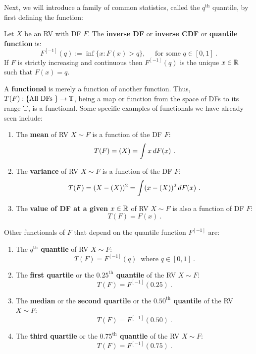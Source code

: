 Next, we will introduce a family of common statistics, called the $q^{\text{th}}$ quantile, by first defining the function:
\begin{definition}
Let $X$ be an RV with DF $F$.  The {\bf inverse DF} or {\bf inverse CDF} or {\bf quantile function} is:
\begin{equation}\label{E:InverseCDF}
F^{[-1]}(q) := \inf { \{ x: F(x) > q \}}, \quad \text{ for some $q \in [0,1]$} \ .
\end{equation}
If $F$ is strictly increasing and continuous then $F^{[-1]}(q)$ is the unique $x \in \mathbb{R}$ such that $F(x)=q$.
\end{definition}
A {\bf functional} is merely a function of another function.  Thus, $T(F): \{ \text{All DFs }\} \to \mathbb{T}$, being a map or function from the space of DFs to its range $\mathbb{T}$, is a functional.  Some specific examples of functionals we have already seen include:
\begin{enumerate}
\item The {\bf mean} of RV $X \sim F$ is a function of the DF $F$:
\[
T(F) = \E(X) = \int x\,dF(x) \ .
\]
\item The {\bf variance} of RV $X \sim F$ is a function of the DF $F$:
\[
T(F) = \mathscr{(}X-\mathscr{(}X))^2 = \int (x-\mathscr{(}X))^2\,dF(x) \ .
\]
\item The {\bf value of DF at a given $x \in \mathbb{R}$} of RV $X \sim F$ is also a function of DF $F$:
\[
T(F) = F(x) \  .
\]
\end{enumerate}
Other functionals of $F$ that depend on the quantile function $F^{[-1]}$ are:
\begin{enumerate}
\item The {\bf $q^{\text{th}}$ quantile} of RV $X \sim F$:
\[
T(F) = F^{[-1]}(q) \ \text{ where } q \in [0,1] \ .
\]
\item The {\bf first quartile} or the {\bf $0.25^{\text{th}}$ quantile} of the RV $X \sim F$:
\[
T(F) = F^{[-1]}(0.25) \ .
\]
\item The {\bf median} or the {\bf second quartile} or the {\bf $0.50^{\text{th}}$ quantile} of the RV $X \sim F$:
\[
T(F) = F^{[-1]}(0.50) \  .
\]
\item The {\bf third quartile} or the {\bf $0.75^{\text{th}}$ quantile} of the RV $X \sim F$:
\[
T(F) = F^{[-1]}(0.75) \ .
\]
\end{enumerate}

